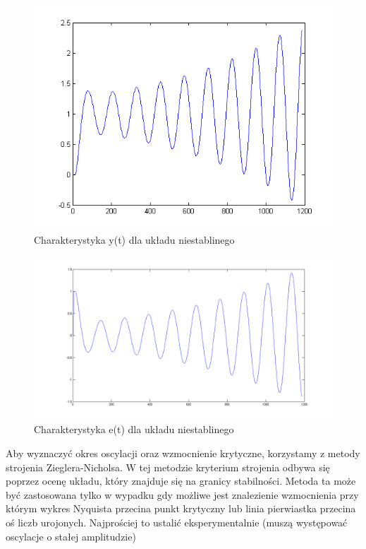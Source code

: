 \documentclass[a4paper,10pt]{article}
\begin{document}
\begin{figure}[!h]
    \centering
	\includegraphics[width=130mm]{CW2-Z3-y.png}
	\caption{Charakterystyka y(t) dla układu niestablinego}
    \label{fig:z3-fy}
\end{figure}
\begin{figure}[!h]
    \centering
	\includegraphics[width=130mm]{CW2-Z3-e.png}
	\caption{Charakterystyka e(t) dla układu niestablinego}
    \label{fig:z3-fe}
\end{figure}
\newpage
Aby wyznaczyć okres oscylacji oraz wzmocnienie krytyczne, korzystamy z metody  strojenia Zieglera-Nicholsa. W tej metodzie kryterium strojenia odbywa się poprzez ocenę układu, który znajduje się na granicy stabilności.
Metoda ta może być zastosowana tylko w wypadku gdy możliwe jest znalezienie wzmocnienia przy którym wykres Nyquista przecina punkt krytyczny lub linia pierwiastka przecina oś liczb urojonych. Najprościej to ustalić eksperymentalnie (muszą występować oscylacje o stałej amplitudzie)
\end{document}
